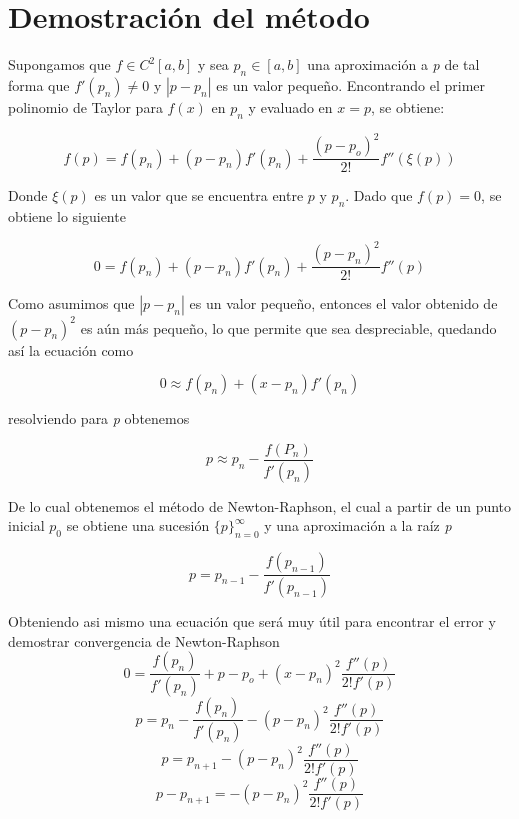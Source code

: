 \section{Demostración del método}
Supongamos que $ f \in C^2[a,b] $ y sea $ p_n \in [a,b]$ una aproximación a \textit{p} de tal forma que $f'(p_n) \neq 0$ y $ | p - p_n | $ es un valor pequeño. Encontrando el primer polinomio de Taylor para $f(x)$ en $p_n$ y evaluado en $x = p$, se obtiene:

\begin{displaymath}
 f(p) = f(p_n) + (p-p_n)f'(p_n) + \frac{(p-p_o)^2}{2!}f''(\xi(p))
\end{displaymath}


\noindent Donde $\xi(p)$ es un valor que se encuentra entre $p$ y $p_n$. Dado que $f(p) = 0$, se obtiene lo siguiente

\begin{displaymath}
 0 = f(p_n) + (p-p_n)f'(p_n) + \frac{(p-p_n)^2}{2!}f''(p)
\end{displaymath}


Como asumimos que $ | p - p_n | $ es un valor pequeño, entonces el valor obtenido de $(p-p_n)^2$ es aún más pequeño, lo que permite que sea despreciable, quedando así la ecuación como

\begin{displaymath}
    0 \approx f(p_n) + (x-p_n)f'(p_n)
\end{displaymath}

resolviendo para \textit{p} obtenemos

\begin{displaymath}
    p \approx p_n - \frac{f(P_n)}{f'(p_n)}
\end{displaymath}

De lo cual obtenemos el método de Newton-Raphson, el cual a partir de un punto inicial $p_0$ se obtiene una sucesión $\{p\}^\infty_{n=0}$ y una aproximación a la raíz \textit{p}

\begin{equation}
    p = p_{n-1} - \frac{f(p_{n-1})}{f'(p_{n-1})}
\end{equation}

Obteniendo asi mismo una ecuación que será muy útil para encontrar el error y demostrar convergencia de Newton-Raphson
\begin{displaymath}
0 = \frac{f(p_n)}{f'(p_n)} + p-p_o +(x-p_n)^2 \frac{f''(p)}{2!f'(p)}
\end{displaymath}
\begin{displaymath}
p = p_n - \frac{f(p_n)}{f'(p_n)}  - (p-p_n)^2 \frac{f''(p)}{2!f'(p)}
\end{displaymath}
\begin{displaymath}
p = p_{n+1}  - (p-p_n)^2 \frac{f''(p)}{2!f'(p)}
\end{displaymath}
\begin{displaymath}
p - p_{n+1} =  - (p-p_n)^2 \frac{f''(p)}{2!f'(p)}
\end{displaymath}